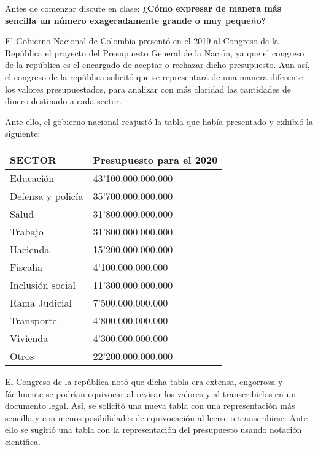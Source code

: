 \documentclass[12pt,a4paper]{article}
\begin{document}
Antes de comenzar discute en clase: \textbf{¿Cómo expresar de manera más sencilla un número exageradamente grande o muy pequeño?}

\vspace{1cm}


El Gobierno Nacional de Colombia presentó en el 2019 al Congreso de la República el proyecto del Presupuesto General de la Nación, ya que el congreso de la república es el encargado de aceptar o rechazar dicho presupuesto. Aun así, el congreso de la república solicitó que se representará de una manera diferente los valores presupuestados, para analizar con más claridad las cantidades de dinero destinado a cada sector.

\vspace{0.5cm}

Ante ello, el gobierno nacional reajustó la tabla que había presentado y exhibió la siguiente:

\vspace{0.5cm}

\begin{center}
\begin{tabular}{|l|l|}
\hline
\cellcolor{fondoazul}\textbf{SECTOR} & \textbf{Presupuesto para el 2020} \\
\hline
Educación & 43'100.000.000.000 \\
\hline
Defensa y policía & 35'700.000.000.000 \\
\hline
Salud & 31'800.000.000.000 \\
\hline
Trabajo & 31'800.000.000.000 \\
\hline
Hacienda & 15'200.000.000.000 \\
\hline
Fiscalía & 4'100.000.000.000 \\
\hline
Inclusión social & 11'300.000.000.000 \\
\hline
Rama Judicial & 7'500.000.000.000 \\
\hline
Transporte & 4'800.000.000.000 \\
\hline
Vivienda & 4'300.000.000.000 \\
\hline
Otros & 22'200.000.000.000 \\
\hline
\end{tabular}
\end{center}

\vspace{0.5cm}

El Congreso de la república notó que dicha tabla era extensa, engorrosa y fácilmente se podrían equivocar al revisar los valores y al transcribirlos en un documento legal. Así, se solicitó una nueva tabla con una representación más sencilla y con menos posibilidades de equivocación al leerse o transcribirse. Ante ello se sugirió una tabla con la representación del presupuesto usando notación científica.
\end{document}
